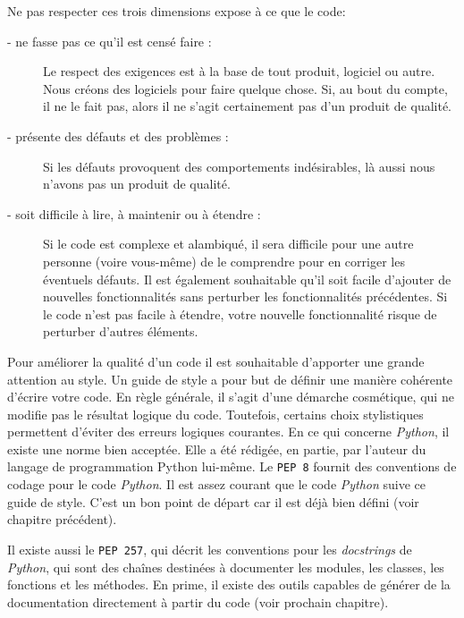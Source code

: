 \documentclass[a4paper,11pt]{book}
\begin{document}
Ne pas respecter ces trois dimensions expose à ce que le code:
\begin{description}
	\item[- ne fasse pas ce qu'il est censé faire :] Le respect des exigences est à la base de tout produit, logiciel ou autre. Nous créons des logiciels pour faire quelque chose. Si, au bout du compte, il ne le fait pas, alors il ne s'agit certainement pas d'un produit de qualité.
	\item[- présente des défauts et des problèmes :] Si les défauts provoquent des comportements indésirables, là aussi nous n'avons pas un produit de qualité.
	\item[- soit difficile à lire, à maintenir ou à étendre :] Si le code est complexe et alambiqué, il sera difficile pour une autre personne (voire vous-même) de le comprendre pour en corriger les éventuels défauts.
Il est également souhaitable qu'il soit facile d'ajouter de nouvelles fonctionnalités sans perturber les fonctionnalités précédentes. Si le code n'est pas facile à étendre, votre nouvelle fonctionnalité risque de perturber d'autres éléments.
\end{description}
\medskip

Pour améliorer la qualité d'un code il est souhaitable d'apporter une grande attention au style. Un guide de style a pour but de définir une manière cohérente d'écrire votre code. En règle générale, il s'agit d'une démarche cosmétique, qui ne modifie pas le résultat logique du code. Toutefois, certains choix stylistiques permettent d'éviter des erreurs logiques courantes.
En ce qui concerne \textit{Python}, il existe une norme bien acceptée. Elle a été rédigée, en partie, par l'auteur du langage de programmation Python lui-même. Le \texttt{PEP 8} fournit des conventions de codage pour le code \textit{Python}. Il est assez courant que le code \textit{Python} suive ce guide de style. C'est un bon point de départ car il est déjà bien défini (voir chapitre précédent).
\medskip

Il existe aussi le \texttt{PEP 257}, qui décrit les conventions pour les \textit{docstrings} de \textit{Python}, qui sont des chaînes destinées à documenter les modules, les classes, les fonctions et les méthodes. En prime, il existe des outils capables de générer de la documentation directement à partir du code (voir prochain chapitre).
\medskip
\end{document}
